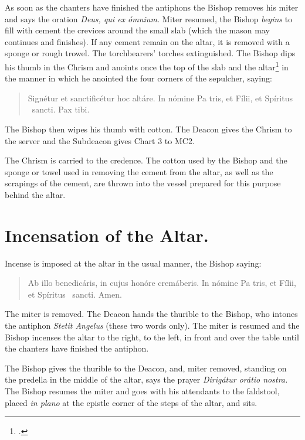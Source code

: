 \documentclass[letterpaper]{report}
\newcommand\blessincense{
\begin{quote}
   Ab illo benedicáris, in cujus honóre cremáberis. In nómine Pa\cross
    tris, et Fí\cross lii, et Spíritus \cross\ sancti. \rbar Amen.
\end{quote}
}
\begin{document}
{    \rubric As soon as the chanters have finished the antiphons the Bishop
    removes his miter and says the oration \textit{Deus, qui ex ómnium.} Miter
    resumed, the Bishop \textit{begins} to fill with cement the crevices around
    the small slab (which the mason may continues and finishes). If any cement
    remain on the altar, it is removed with a sponge or rough
    trowel. The torchbearers' torches extinguished. The Bishop dips his
    thumb in the Chrism and anoints once the top of the slab and the
    altar\footcite[Martinucci, Hartmann, Moretti, etc., say that the cross
    should be made not only on the slab, but also on the portions of the table
    of the altar near the slab.][footnote 1, p. 90.]{consecranda} in the manner
    in which he anointed the four corners of the sepulcher, saying:

    \begin{quote}
        Signé\cross tur et sancti\cross ficétur hoc altáre. In nómine Pa\cross
        tris, et Fí\cross lii, et Spíritus \cross\ sancti. Pax tibi.
    \end{quote}

    The Bishop then wipes his thumb with cotton. The Deacon gives the Chrism to the
    server and the Subdeacon gives Chart 3 to MC2.

    The Chrism is carried to the credence. The cotton used by the Bishop and
    the sponge or towel used in removing the cement from the altar, as well as
    the scrapings of the cement, are thrown into the vessel prepared for this
    purpose behind the altar.

    \section{Incensation of the Altar.}

    \rubric Incense is imposed at the altar in the usual manner, the Bishop
    saying:

    \blessincense

    The miter is removed. The Deacon hands the thurible to the Bishop, who
    intones the antiphon \textit{Stetit Angelus} (these two words only). The
    miter is resumed and the Bishop incenses the altar to the right, to the
    left, in front and over the table until the chanters have finished the
    antiphon.

    \rubric The Bishop gives the thurible to the Deacon, and, miter removed,
    standing on the predella in the middle of the altar, says the prayer
    \textit{Dirigátur orátio nostra.} The Bishop resumes the miter and goes
    with his attendants to the faldstool, placed \textit{in plano} at the
    epistle corner of the steps of the altar, and sits.

}
\end{document}
